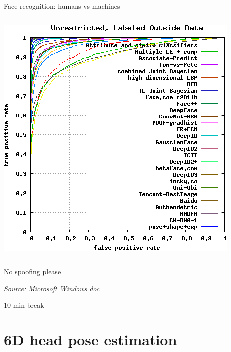 \documentclass[compress]{beamer}
\makeatletter
\let\beamer@writeslidentry@miniframeson=\beamer@writeslidentry
\def\beamer@writeslidentry@miniframesoff{%
  \expandafter\beamer@ifempty\expandafter{\beamer@framestartpage}{}%
  {%
    \clearpage\beamer@notesactions%
  }
}
\newcommand*{\miniframeson}{\let\beamer@writeslidentry=\beamer@writeslidentry@miniframeson}
\newcommand*{\miniframesoff}{\let\beamer@writeslidentry=\beamer@writeslidentry@miniframesoff}
\newcommand{\source}[2]{{\tiny\it Source: \href{#1}{#2}}}
\makeatother
\begin{document}
\begin{frame}{Face recognition: humans vs machines}
\begin{columns}
\begin{column}{0.5\linewidth}
\begin{center}
                \includegraphics[width=\linewidth]{lfw_unrestricted_labeled}
            \end{center}
        \end{column}
    \end{columns}

\end{frame}



\begin{frame}{No spoofing please}


\source{https://docs.microsoft.com/en-us/windows-hardware/design/device-experiences/windows-hello-face-authentication}{Microsoft
    Windows doc}
\end{frame}


\miniframesoff
\begin{frame}[plain]
    \begin{center}
        \Large
        10 min break\\[2em]
    \end{center}
\end{frame}
\miniframeson


\section[Head pose]{6D head pose estimation}
\end{document}
